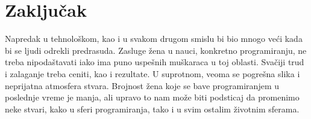 \documentclass[a4paper,12pt]{article}
\begin{document}
\section{Zaključak}
\begin{flushleft}
Napredak u tehnološkom, kao i u svakom drugom smislu bi bio mnogo veći kada bi se ljudi odrekli predrasuda. Zasluge žena  u nauci, konkretno programiranju, ne treba nipodaštavati iako ima puno uspešnih muškaraca u toj oblasti. Svačiji trud i zalaganje treba ceniti, kao i rezultate. U suprotnom, veoma se pogrešna slika i neprijatna atmosfera stvara. Brojnost žena koje se bave programiranjem u poslednje vreme je manja, ali upravo to nam može biti podsticaj da promenimo neke stvari, kako u sferi programiranja, tako i u svim ostalim životnim sferama.
\end{flushleft}

\newpage



\cite{ashcraft2016women}
\cite{branson2018future}
\cite{mauchly1980eniac}
\cite{punt2018ada}
\cite{actionmargaret}
\end{document}
